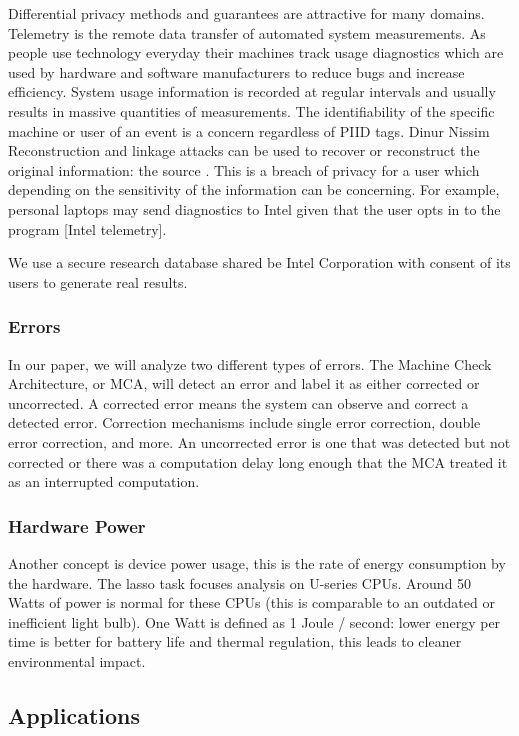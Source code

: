 \documentclass[12pt,letterpaper]{article}
\begin{document}
Differential privacy methods and guarantees are attractive for many domains. Telemetry is the remote data transfer of automated system measurements. As people use technology everyday their machines track usage diagnostics which are used by hardware and software manufacturers to reduce bugs and increase efficiency. System usage information is recorded at regular intervals and usually results in massive quantities of measurements. The identifiability of the specific machine or user of an event is a concern regardless of PIID tags. Dinur Nissim Reconstruction and linkage attacks can be used to recover or reconstruct the original information: the source \cite{DinurReconstruction}. This is a breach of privacy for a user which depending on the sensitivity of the information can be concerning. For example, personal laptops may send diagnostics to Intel given that the user opts in to the program [Intel telemetry]. 

We use a secure research database shared be Intel Corporation with consent of its users to generate real results.

\subsubsection{Errors}

In our paper, we will analyze two different types of errors. The Machine Check Architecture, or MCA, will detect an error and label it as either corrected or uncorrected. A corrected error means the system can observe and correct a detected error. Correction mechanisms include single error correction, double error correction, and more. An uncorrected error is one that was detected but not corrected or there was a computation delay long enough that the MCA treated it as an interrupted computation. \cite{Kwasnick2023}

\subsubsection{Hardware Power}

Another concept is device power usage, this is the rate of energy consumption by the hardware. The lasso task focuses analysis on U-series CPUs. Around 50 Watts of power is normal for these CPUs (this is comparable to an outdated or inefficient light bulb). One Watt is defined as 1 Joule / second: lower energy per time is better for battery life and thermal regulation, this leads to cleaner environmental impact. 

\subsection{Applications}
\end{document}
